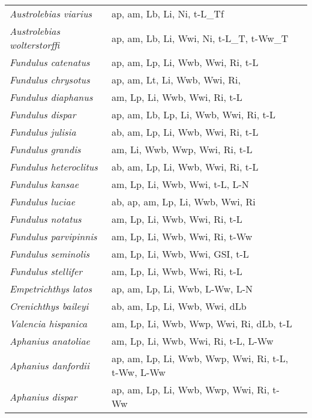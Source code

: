 {\begin{longtable}[c]{p{3.5cm}p{5.5cm}p{5.5cm}}
\emph{Austrolebias viarius} &  ap, am, Lb, Li, Ni, t-L\_Tf & \citet{ErreDanu2001} \\
\emph{Austrolebias wolterstorffi} &  ap, am, Lb, Li, Wwi, Ni, t-L\_T, t-Ww\_T & \citet{FonsVolc2013} \\
\emph{Fundulus catenatus} &  ap, am, Lp, Li, Wwb, Wwi, Ri, t-L & \citet{WallSimo2006} \\
\emph{Fundulus chrysotus} &  ap, am, Lt, Li, Wwb, Wwi, Ri,  &  \\
\emph{Fundulus diaphanus} &  am, Lp, Li, Wwb, Wwi, Ri, t-L & \citet{EdbePowe2010,PhilEwer2007} \\
\emph{Fundulus dispar} &  ap, am, Lb, Lp, Li, Wwb, Wwi, Ri, t-L & \citet{WallSimo2006} \\
\emph{Fundulus julisia} &  ab, am, Lp, Li, Wwb, Wwi, Ri, t-L & \citet{Rake1989} \\
\emph{Fundulus grandis} &  am, Li, Wwb, Wwp, Wwi, Ri, t-L & \citet{PattAllg2013,VastAbie2017} \\
\emph{Fundulus heteroclitus} &  ab, am, Lp, Li, Wwb, Wwi, Ri, t-L & \citet{KneiStiv1978} \\
\emph{Fundulus kansae} &  am, Lp, Li, Wwb, Wwi, t-L, L-N & \citet{MincKlaa1969} \\
\emph{Fundulus luciae} &  ab, ap, am, Lp, Li, Wwb, Wwi, Ri & \citet{Byrn1976} \\
\emph{Fundulus notatus} &  am, Lp, Li, Wwb, Wwi, Ri, t-L & \citet{NiemWall1974} \\
\emph{Fundulus parvipinnis} &  am, Lp, Li, Wwb, Wwi, Ri, t-Ww & \citet{PereGalv1998} \\
\emph{Fundulus seminolis} &  am, Lp, Li, Wwb, Wwi, GSI, t-L & \citet{DuraShir1979} \\
\emph{Fundulus stellifer} &  am, Lp, Li, Wwb, Wwi, Ri, t-L & \citet{EdbePowe2010} \\
\emph{Empetrichthys latos} &  ap, am, Lp, Li, Wwb, L-Ww, L-N & \citet{DeacWill2010,Good2016,UribGrie2012} \\
\emph{Crenichthys baileyi} &  ab, am, Lp, Li, Wwb, Wwi, dLb & \citet{Kope1949} \\
\emph{Valencia hispanica} &  am, Lp, Li, Wwb, Wwp, Wwi, Ri, dLb, t-L & \citet{CaioVerg2001} \\
\emph{Aphanius anatoliae} &  am, Lp, Li, Wwb, Wwi, Ri, t-L, L-Ww & \citet{GuclTurn2007} \\
\emph{Aphanius danfordii} &  ap, am, Lp, Li, Wwb, Wwp, Wwi, Ri, t-L, t-Ww, L-Ww & \citet{YugoEkme2012} \\
\emph{Aphanius dispar} &  ap, am, Lp, Li, Wwb, Wwp, Wwi, Ri, t-Ww & \citet{FrenGore2000} \\

\end{longtable}}
